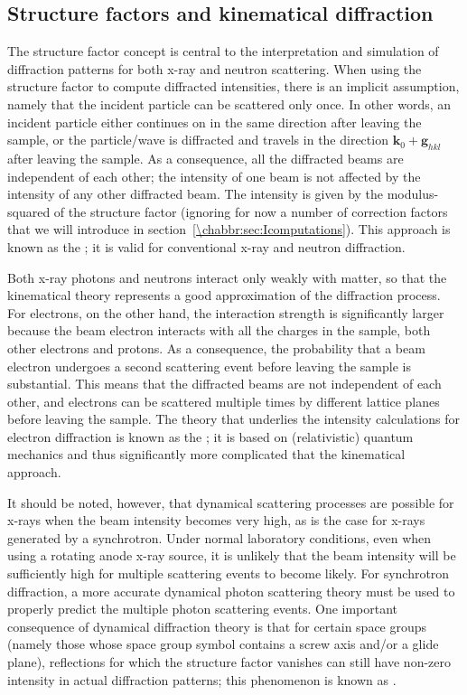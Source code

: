 \subsection{Structure factors and kinematical diffraction}\label{\chabbr:ssec:SFkinematical}
The structure factor concept is central to the interpretation and simulation of diffraction patterns for both x-ray and neutron scattering.  When using the structure factor to compute diffracted intensities, there is an implicit assumption, namely that the incident particle can be scattered only once.  In other words, an incident particle either continues on in the same direction after leaving the sample, or the particle/wave is diffracted  and travels in the direction $\mathbf{k}_0+\mathbf{g}_{hkl}$ after leaving the sample. As a consequence, all the diffracted beams are independent of each other; the intensity of one beam is not affected by the intensity of any other diffracted beam.  The intensity is given by the modulus-squared of the structure factor (ignoring for now a number of correction factors that we will introduce in section~\ref{\chabbr:sec:Icomputations}).  This approach is known as the ; it is valid for conventional x-ray and neutron diffraction.

Both x-ray photons and neutrons interact only weakly with matter, so that the kinematical theory represents a good approximation of the diffraction process.  For electrons, on the other hand, the interaction strength is significantly larger because the beam electron interacts with all the charges in the sample, both other electrons and protons.  As a consequence, the probability that a beam electron undergoes a second scattering event before leaving the sample is substantial. This means that the diffracted beams are not independent of each other, and electrons can be scattered multiple times by different lattice planes before leaving the sample.  The theory that underlies the intensity calculations for electron diffraction is known as the ; it is based on (relativistic) quantum mechanics and thus significantly more complicated that the kinematical approach.

It should be noted, however, that dynamical scattering processes are possible for x-rays when the beam intensity becomes very high, as is the case for x-rays generated by a synchrotron.  Under normal laboratory conditions, even when using a rotating anode x-ray source, it is unlikely that the beam intensity will be sufficiently high for multiple scattering events to become likely. For synchrotron diffraction, a more accurate dynamical photon scattering theory must be used to properly predict the multiple photon scattering events.  One important consequence of dynamical diffraction theory is that for certain space groups (namely those whose space group symbol contains a screw axis and/or a glide plane), reflections for which the structure factor vanishes can still have non-zero intensity in actual diffraction patterns; this phenomenon is known as .



